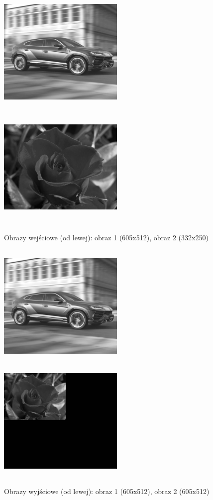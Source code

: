 \documentclass[magisterska,openany]{pracadypl}
\begin{document}
\newpage
\begin{figure}[h]
\centering
\includegraphics[width=6cm, height=6cm]{orgi/gLU.jpg}
\includegraphics[width=6cm, height=6cm]{orgi/groza.jpg}
\caption{Obrazy wejściowe (od lewej): obraz 1 (605x512), obraz 2 (332x250) }
\end{figure}
\begin{figure}[h]
\centering
\includegraphics[width=6cm, height=6cm]{2_1/GeoG3.jpg}
\includegraphics[width=6cm, height=6cm]{2_1/GeoG4.jpg}
\caption{Obrazy wyjściowe (od lewej): obraz 1 (605x512), obraz 2 (605x512) }
\end{figure}
\end{document}
